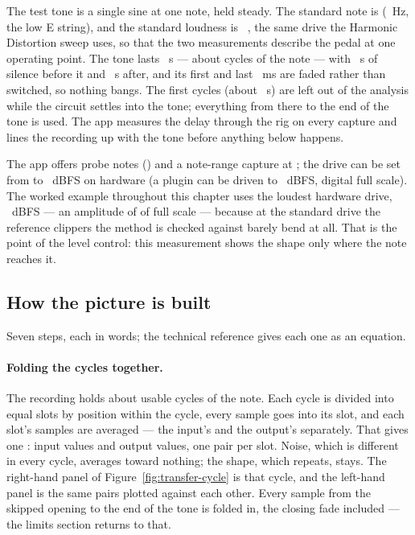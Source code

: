 \documentclass[11pt,a4paper]{article}
\begin{document}
The test tone is a single sine at one note, held steady. The standard
note is \tcNote{} (\tcNoteHz{}~Hz, the low E string), and the standard
loudness is \tcLevelDBFSRounded{}~, the same drive the
Harmonic Distortion sweep uses, so that the two measurements describe the
pedal at one operating point. The tone lasts \tcDurationS{}~s --- about
\tcTotalCycles{} cycles of the note --- with \tcPrerollS{}~s of silence
before it and \tcTailS{}~s after, and its first and last \tcFadeMs{}~ms
are faded rather than switched, so nothing bangs. The first
\tcSkipCycles{} cycles (about \tcSkippedS{}~s) are left out of the
analysis while the circuit settles into the tone; everything from there to
the end of the tone is used. The app measures the delay through the rig
on every capture and lines the recording up with the tone before anything
below happens.

The app offers \tcProbeNoteCount{} probe notes (\tcProbeNotes) and a
note-range capture at \tcRangeNotes; the drive can be set from
\tcFloorDBFS{} to \tcCeilingDBFS{}~dBFS on hardware (a plugin can be
driven to \tcPluginCeilingDBFS{}~dBFS, digital full scale). The worked
example throughout this chapter uses the loudest hardware drive,
\tcCeilingDBFS{}~dBFS --- an amplitude of \tcCeilingAmplitude{} of full
scale --- because at the standard drive the reference clippers the method
is checked against barely bend at all. That is the point of the level
control: this measurement shows the shape only where the note reaches it.

\subsection{How the picture is built}

Seven steps, each in words; the technical reference gives each one as an
equation.

\paragraph{Folding the cycles together.} The recording holds about
\tcBinnedCycles{} usable cycles of the note. Each cycle is divided into
\tcBins{} equal slots by position within the cycle, every sample goes into
its slot, and each slot's samples are averaged --- the input's and the
output's separately. That gives one : \tcBins{} input
values and \tcBins{} output values, one pair per slot. Noise, which is
different in every cycle, averages toward nothing; the shape, which
repeats, stays. The right-hand panel of Figure~\ref{fig:transfer-cycle}
is that cycle, and the left-hand panel is the same \tcBins{} pairs plotted
against each other. Every sample from the skipped opening to the end of
the tone is folded in, the closing fade included --- the limits section
returns to that.
\end{document}
